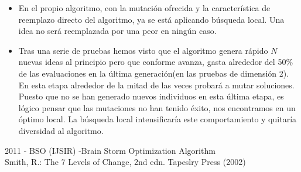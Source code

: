 \begin{itemize}
	\item En el propio algoritmo, con la mutación ofrecida y la característica de reemplazo directo del algoritmo, ya se está aplicando búsqueda local. Una idea no será reemplazada por una peor en ningún caso.

	\item Tras una serie de pruebas hemos visto que el algoritmo genera rápido $N$ nuevas ideas al principio pero que conforme avanza, gasta alrededor del 50\% de las evaluaciones en la última generación(en las pruebas de dimensión 2). En esta etapa alrededor de la mitad de las veces probará a mutar soluciones. Puesto que no se han generado nuevos individuos en esta última etapa, es lógico pensar que las mutaciones no han tenido éxito, nos encontramos en un óptimo local. La búsqueda local intensificaría este comportamiento y quitaría diversidad al algoritmo.
\end{itemize}

\newpage
\begin{thebibliography}{9}
	 2011 - BSO (IJSIR) -Brain Storm Optimization Algorithm\\

	 Smith, R.: The 7 Levels of Change, 2nd edn. Tapeslry Press (2002)\\

\end{thebibliography}



